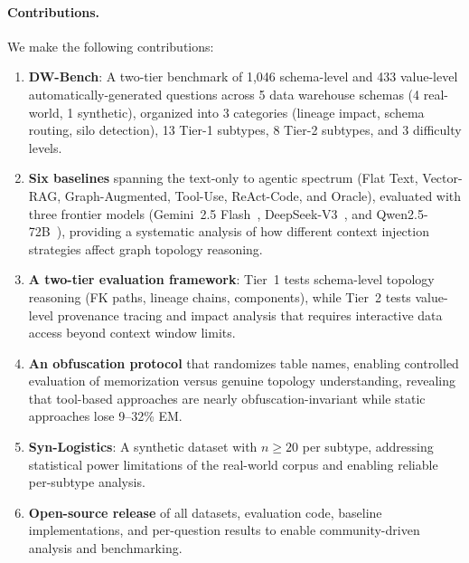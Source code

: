 \paragraph{Contributions.} We make the following contributions:

\begin{enumerate}
  \item \textbf{DW-Bench}: A two-tier benchmark of 1,046 schema-level and
    433 value-level automatically-generated questions across 5 data warehouse
    schemas (4 real-world, 1 synthetic), organized into 3 categories
    (lineage impact, schema routing, silo detection), 13 Tier-1 subtypes,
    8 Tier-2 subtypes, and 3 difficulty levels.

  \item \textbf{Six baselines} spanning the text-only to agentic spectrum
    (Flat Text, Vector-RAG, Graph-Augmented, Tool-Use, ReAct-Code, and
    Oracle), evaluated with three frontier models (Gemini~2.5 Flash~\cite{gemini2024},
    DeepSeek-V3~\cite{deepseek2024v3}, and Qwen2.5-72B~\cite{qwen2024}), providing a systematic analysis of how different
    context injection strategies affect graph topology reasoning.

  \item \textbf{A two-tier evaluation framework}: Tier~1 tests schema-level
    topology reasoning (FK paths, lineage chains, components), while Tier~2
    tests value-level provenance tracing and impact analysis that requires
    interactive data access beyond context window limits.

  \item \textbf{An obfuscation protocol} that randomizes table names,
    enabling controlled evaluation of memorization versus genuine topology
    understanding, revealing that tool-based approaches are nearly
    obfuscation-invariant while static approaches lose 9--32\% EM.

  \item \textbf{Syn-Logistics}: A synthetic dataset with $n\geq20$ per
    subtype, addressing statistical power limitations of the real-world
    corpus and enabling reliable per-subtype analysis.

  \item \textbf{Open-source release} of all datasets, evaluation code,
    baseline implementations, and per-question results to enable
    community-driven analysis and benchmarking.
\end{enumerate}


